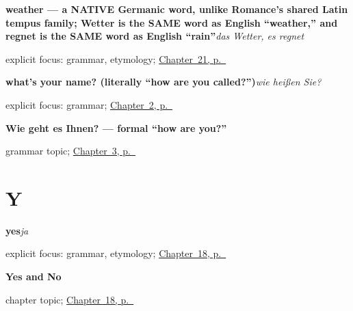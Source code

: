 \noindent\begin{minipage}[t]{\linewidth}
\raggedright
\textbf{weather — a NATIVE Germanic word, unlike Romance's shared Latin tempus family; Wetter is the SAME word as English \textquotedblleft{}weather,\textquotedblright{} and regnet is the SAME word as English \textquotedblleft{}rain\textquotedblright{}}\enspace\emph{das Wetter, es regnet}\par
\footnotesize explicit focus: grammar, etymology; \hyperref[ch:ge-weather]{Chapter~21, p.~\pageref*{ch:ge-weather}}
\end{minipage}\par\smallskip

\noindent\begin{minipage}[t]{\linewidth}
\raggedright
\textbf{what's your name? (literally \textquotedblleft{}how are you called?\textquotedblright{})}\enspace\emph{wie heißen Sie?}\par
\footnotesize explicit focus: grammar; \hyperref[ch:introductions]{Chapter~2, p.~\pageref*{ch:introductions}}
\end{minipage}\par\smallskip

\noindent\begin{minipage}[t]{\linewidth}
\raggedright
\textbf{Wie geht es Ihnen? — formal “how are you?”}\par
\footnotesize grammar topic; \hyperref[ch:how-are-you]{Chapter~3, p.~\pageref*{ch:how-are-you}}
\end{minipage}\par\smallskip

\section*{Y}

\noindent\begin{minipage}[t]{\linewidth}
\raggedright
\textbf{yes}\enspace\emph{ja}\par
\footnotesize explicit focus: grammar, etymology; \hyperref[ch:ge-yes-and-no]{Chapter~18, p.~\pageref*{ch:ge-yes-and-no}}
\end{minipage}\par\smallskip

\noindent\begin{minipage}[t]{\linewidth}
\raggedright
\textbf{Yes and No}\par
\footnotesize chapter topic; \hyperref[ch:ge-yes-and-no]{Chapter~18, p.~\pageref*{ch:ge-yes-and-no}}
\end{minipage}\par\smallskip

